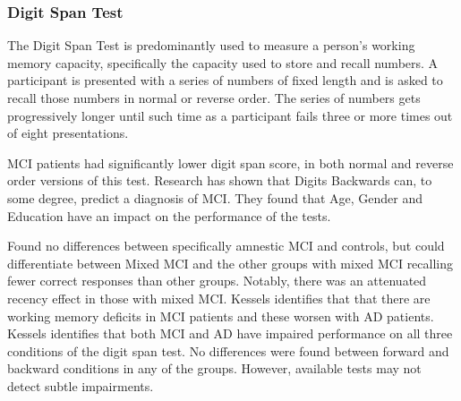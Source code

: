 \documentclass{article}
\begin{document}
\subsubsection{Digit Span Test}
The Digit Span Test is predominantly used to measure a person's working memory capacity, specifically the capacity used to store and recall numbers. A participant is presented with a series of numbers of fixed length and is asked to recall those numbers in normal or reverse order. The series of numbers gets progressively longer until such time as a participant fails three or more times out of eight presentations.
\par
MCI patients had significantly lower digit span score, in both normal and reverse order versions of this test. Research has shown that Digits Backwards can, to some degree, predict a diagnosis of MCI. They found that Age, Gender and Education have an impact on the performance of the tests.
\par
Found no differences between specifically amnestic MCI and controls, but could differentiate between Mixed MCI and the other groups with mixed MCI recalling fewer correct responses than other groups. Notably, there was an attenuated recency effect in those with mixed MCI.
Kessels identifies that that there are working memory deficits in MCI patients and these worsen with AD patients.
Kessels identifies that both MCI and AD have impaired performance on all three conditions of the digit span test. No differences were found between forward and backward conditions in any of the groups. However, available tests may not detect subtle impairments.
\end{document}
